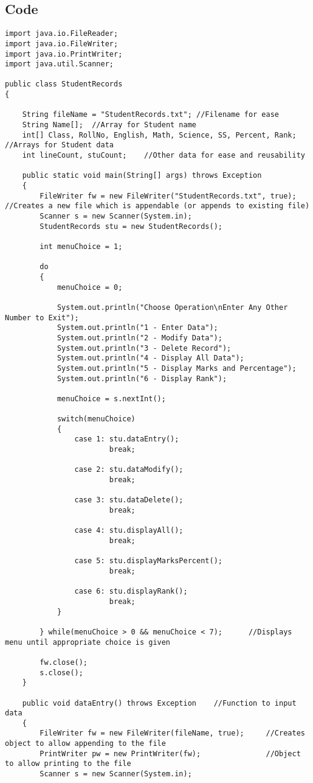 \documentclass[ProgramminAssignment.tex]{subfiles}
\begin{document}
\subsection{Code}
\begin{lstlisting}
import java.io.FileReader;
import java.io.FileWriter;
import java.io.PrintWriter;
import java.util.Scanner;

public class StudentRecords
{

	String fileName = "StudentRecords.txt";	//Filename for ease
	String Name[];	//Array for Student name
	int[] Class, RollNo, English, Math, Science, SS, Percent, Rank;	//Arrays for Student data
	int lineCount, stuCount;	//Other data for ease and reusability
	
	public static void main(String[] args) throws Exception
	{
		FileWriter fw = new FileWriter("StudentRecords.txt", true);		//Creates a new file which is appendable (or appends to existing file)
		Scanner s = new Scanner(System.in);
		StudentRecords stu = new StudentRecords();
		
		int menuChoice = 1;
		
		do
		{
			menuChoice = 0;
			
			System.out.println("Choose Operation\nEnter Any Other Number to Exit");
			System.out.println("1 - Enter Data");
			System.out.println("2 - Modify Data");
			System.out.println("3 - Delete Record");
			System.out.println("4 - Display All Data");
			System.out.println("5 - Display Marks and Percentage");
			System.out.println("6 - Display Rank");
			
			menuChoice = s.nextInt();
			
			switch(menuChoice)
			{
				case 1:	stu.dataEntry();
						break;
						
				case 2:	stu.dataModify();
						break;
						
				case 3:	stu.dataDelete();
						break;
						
				case 4:	stu.displayAll();
						break;
					
				case 5:	stu.displayMarksPercent();
						break;
						
				case 6:	stu.displayRank();
						break;
			}
			
		} while(menuChoice > 0 && menuChoice < 7);		//Displays menu until appropriate choice is given
		
		fw.close();
		s.close();
	}
	
	public void dataEntry() throws Exception	//Function to input data
	{
		FileWriter fw = new FileWriter(fileName, true);		//Creates object to allow appending to the file
		PrintWriter pw = new PrintWriter(fw);				//Object to allow printing to the file
		Scanner s = new Scanner(System.in);
		

\end{lstlisting}
\end{document}
